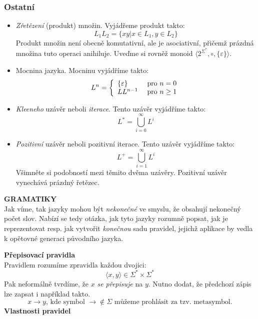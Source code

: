\documentclass[10pt,a4paper]{article}
\theoremstyle{note}
\begin{document}
		\subsubsection{Ostatní}
		\begin{itemize}
		\item
		\textit{Zřetězení} (produkt) množin. Vyjádřeme produkt takto:
		$$
		L_{1}L_{2} = \lbrace xy | x \in L_{1}, y \in L_{2} \rbrace
		$$
		Produkt množin není obecně komutativní, ale je asociativní, přičemž prázdná množina tuto operaci anihiluje.
		Uveďme si rovněž monoid $\langle 2^{\Sigma^{*}}, \circ, \lbrace \varepsilon \rbrace \rangle$.

		\item
		\textit{}{Mocnina} jazyka. Mocninu vyjádříme takto:
		$$
		L^{n} = \left \lbrace
		\begin{array}{l l}
		\lbrace \varepsilon \rbrace & \text{ pro } n = 0 \\
		LL^{n-1} & \text{ pro } n \geq 1 \\
		\end{array}
		\right.
		$$

		\item
		\textit{Kleeneho} uzávěr neboli 	\textit{iterace}. Tento uzávěr vyjádříme takto:
		$$
		L^{*} = \bigcup_{i = 0}^{\infty} L^{i}
		$$

		\item
		\textit{Pozitivní} uzávěr neboli pozitivní iterace. Tento uzávěr vyjádříme takto:
		$$
		L^{+} = \bigcup_{i = 1}^{\infty} L^{i}
		$$
		Všimněte si podobností mezi těmito dvěma uzávěry. Pozitivní uzávěr vynechává prázdný řetězec.

		\end{itemize}

		\textbf{GRAMATIKY}\\

		\vspace{3mm}
Jak víme, tak jazyky mohou být \textit{nekonečné} ve smyslu, že obsahují nekonečný počet slov.
Nabízí se tedy otázka, jak tyto jazyky rozumně popsat, jak je reprezentovat resp. jak vytvořit \textit{konečnou}
sadu pravidel, jejichž aplikace by vedla k opětovné generaci původního jazyka.


		\textbf{Přepisovací pravidla}\\

		\vspace{3mm}
Pravidlem rozumíme zpravidla každou dvojici:
$$
\langle x,y \rangle \in \Sigma^{*} \times \Sigma^{*}
$$
Pak neformálně tvrdíme, že $x$ \textit{se přepisuje} na $y$.
Nutno dodat, že předchozí zápis lze zapsat i například takto.
$$
x \rightarrow y\text{, kde symbol } \rightarrow \notin \Sigma \text{ můžeme prohlásit za tzv. metasymbol.}
$$
		\textbf{Vlastnosti pravidel}\\
\end{document}
